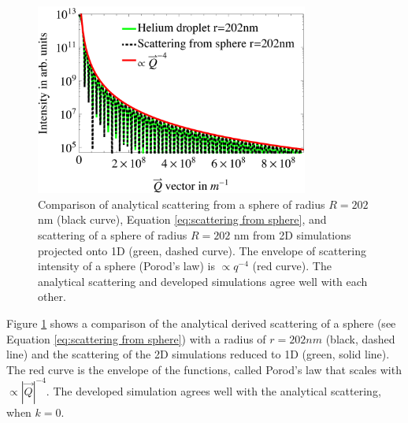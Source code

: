 \begin{figure}
	\centering
		\includegraphics[width=0.80\textwidth]{images/cluster-sphere-intact.png}
	\caption[Comparison of analytical derived scattering and numerical simulations.]{Comparison of analytical scattering from a sphere of radius $R=202$ nm (black curve), Equation \eqref{eq:scattering from sphere}, and scattering of a sphere of radius $R=202$ nm from 2D simulations projected onto 1D (green, dashed curve). The envelope of scattering intensity of a sphere (Porod's law) is $\propto q^{-4}$ (red curve). The analytical scattering and developed simulations agree well with each other.}
	\label{fig:cluster-sphere-intact-2D}
\end{figure}
Figure \ref{fig:cluster-sphere-intact-2D} shows a comparison of the analytical derived scattering of a sphere (see Equation \eqref{eq:scattering from sphere}) with a radius of $r=202nm$ (black, dashed line) and the scattering of the 2D simulations reduced to 1D (green, solid line). The red curve is the envelope of the functions, called Porod's law that scales with $\propto \left|\vec{Q}\right|^{-4}$. The developed simulation agrees well with the analytical scattering, when $k=0$.
%
%
%

